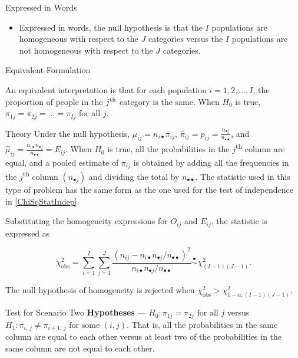 \documentclass[
  ignorenonframetext,
]{beamer}
\providecommand{\tightlist}{%
  \setlength{\itemsep}{0pt}\setlength{\parskip}{0pt}}
\begin{document}
\begin{frame}{Expressed in Words}
\protect\hypertarget{expressed-in-words}{}
\begin{itemize}
\tightlist
\item
  Expressed in words, the null hypothesis is that the \(I\) populations
  are homogeneous with respect to the \(J\) categories versus the \(I\)
  populations are not homogeneous with respect to the \(J\) categories.
\end{itemize}
\end{frame}

\begin{frame}{Equivalent Formulation}
\protect\hypertarget{equivalent-formulation}{}
\begin{tcolorbox}
An equivalent interpretation is that for each population $i=1,2,\dots, I$, the
proportion of people in the $j\textsuperscript{th}$ category is the same.  When $H_0$ is
true, $\pi_{1j}=\pi_{2j}=\dots=\pi_{Ij}$ for all $j$.
\end{tcolorbox}
\end{frame}

\begin{frame}{Theory}
\protect\hypertarget{theory}{}
Under the null hypothesis, \(\mu_{ij}= n_{i\bullet} \pi_{ij}\),
\(\hat\pi_{ij}=p_{ij}= \frac{n_{\bullet j}}{n_{\bullet\bullet}}\), and
\(\hat{\mu}_{ij}= \frac{n_{i\bullet} n_{\bullet j}}{n_{\bullet\bullet}}=E_{ij}\).
When \(H_0\) is true, all the probabilities in the
\(j\)\textsuperscript{th} column are equal, and a pooled estimate of
\(\pi_{ij}\) is obtained by adding all the frequencies in the
\(j\)\textsuperscript{th} column \((n_{\bullet j})\) and dividing the
total by \(n_{\bullet\bullet}\). The statistic used in this type of
problem has the same form as the one used for the test of independence
in \eqref{ChiSqStatIndep}.

Substituting the homogeneity expressions for \(O_{ij}\) and \(E_{ij}\),
the statistic is expressed as

\[\chi_{\text{obs}}^2=\sum_{i=1}^I\sum_{j=1}^J \frac{(n_{ij} - n_{i\bullet} n_{\bullet
j}/n_{\bullet\bullet})^2}{n_{i\bullet} n_{\bullet j}/n_{\bullet\bullet}} \overset{\bullet}{\sim}
\chi^2_{(I-1)(J-1)}.\]

The null hypothesis of homogeneity is rejected when
\(\chi_{\text{obs}}^2 > \chi^2_{1-\alpha; (I-1)(J-1)}\).
\end{frame}

\begin{frame}{Test for Scenario Two}
\protect\hypertarget{test-for-scenario-two}{}
\textbf{Hypotheses} --- \(H_0: \pi_{1j}=\pi_{2j} \text{ for all } j\)
versus \(H_1: \pi_{i,\, j} \ne \pi_{i+1,\, j}\text{ for some }(i, j)\).
That is, all the probabilities in the same column are equal to each
other versus at least two of the probabilities in the same column are
not equal to each other.
\end{frame}
\end{document}
